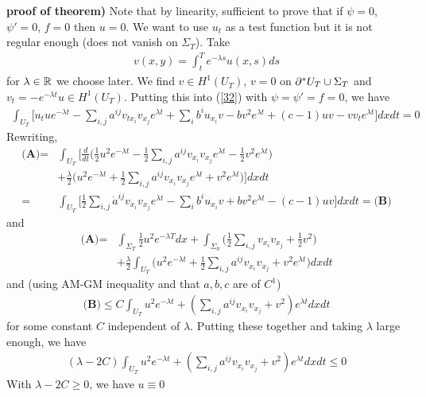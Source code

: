 \documentclass[12pt,a4paper]{report}
\newenvironment{proof}
{\begin{changemargin}{1cm}{0.5cm} 
	}%
	{\end{changemargin}
}
\begin{document}
\begin{proof}
\textbf{proof of theorem)} Note that by linearity, sufficient to prove that if $\psi = 0$, $\psi'=0$, $f=0$ then $u=0$. We want to use $u_t$ as a test function but it is not regular enough (does not vanish on $\Sigma_T$). Take
\begin{align*}
v(x,y) = \int_t^T e^{-\lambda s} u(x,s) ds
\end{align*}
for $\lambda\in \mathbb{R}$ we choose later. We find $v\in H^1(U_T)$, $v=0$ on $\partial^* U_T \cup \Sigma_T$ and $v_t = -e^{-\lambda t} u \in H^1(U_T)$. Putting this into (\ref{32}) with $\psi = \psi' =f=0$, we have
\begin{align*}
\int_{U_T} \Big[ u_t u e^{-\lambda t} - \sum_{i,j} a^{ij} v_{tx_i} v_{x_j} e^{\lambda t} + \sum_{i} b^i u_{x_i} v - bv^2 e^{\lambda t} + (c- 1)uv -   vv_t e^{\lambda t} \Big] dxdt = 0
\end{align*}
Rewriting,
\begin{align*}
\textbf{(A)} =& \int_{U_T} \Big[ \frac{d}{dt} \Big( \frac{1}{2}u^2 e^{-\lambda t} -\frac{1}{2} \sum_{i,j}a^{ij} v_{x_i}v_{x_j} e^{\lambda t} - \frac{1}{2}v^2 e^{\lambda t} \Big) \\
&+ \frac{\lambda}{2} \Big( u^2 e^{-\lambda t} + \frac{1}{2} \sum_{i,j} a^{ij}v_{x_i}v_{x_j} e^{\lambda t} + v^2 e^{\lambda t} \Big) \Big] dxdt \\
=& \int_{U_T} \Big[ \frac{1}{2} \sum_{i,j} \dot{a}^{ij} v_{x_i}v_{x_j} e^{\lambda t} - \sum_{i} b^i u_{x_i} v + bv^2 e^{\lambda t} -(c-1)uv \Big] dxdt = \textbf{(B)}
\end{align*}
and
\begin{align*}
\textbf{(A)} = & \int_{\Sigma_T} \frac{1}{2} u^2 e^{-\lambda T} dx + \int_{\Sigma_0} \Big( \frac{1}{2} \sum_{i,j} v_{x_i} v_{x_j}  + \frac{1}{2} v^2\Big) \\
& + \frac{\lambda}{2} \int_{U_T} \Big( u^2 e^{-\lambda t} + \frac{1}{2} \sum_{i,j} a^{ij} v_{x_i}v_{x_j} + v^2 e^{\lambda t} \Big) dxdt
\end{align*}
and (using AM-GM inequality and that $a,b,c$ are of $C^1$)
\begin{align*}
\textbf{(B)} \leq C \int_{U_T} u^2 e^{-\lambda t} + (\sum_{i,j} a^{ij} v_{x_i} v_{x_j} + v^2)e^{\lambda t} dxdt
\end{align*}
for some constant $C$ independent of $\lambda$. Putting these together and taking $\lambda$ large enough, we have
\begin{align*}
(\lambda -2C) \int_{U_T} u^2 e^{-\lambda t} + (\sum_{i,j} a^{ij}v_{x_i}v_{x_j} + v^2)e^{\lambda t} dxdt \leq 0
\end{align*}
With $\lambda -2C \geq 0$, we have $u\equiv 0$

\eop
\end{proof}
\end{document}
